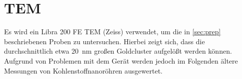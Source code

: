 \newpage
\section{TEM} %

 Es wird ein Libra 200 FE TEM (Zeiss) verwendet, um die in \cref{sec:prep} beschriebenen Proben zu untersuchen.
 Hierbei zeigt sich, dass die durchschnittlich etwa \SI{20}{nm} großen Goldcluster aufgelößt werden können.
 Aufgrund von Problemen mit dem Gerät werden jedoch im Folgenden ältere Messungen von Kohlenstoffnanoröhren ausgewertet.




